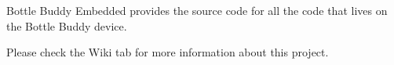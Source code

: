 Bottle Buddy Embedded provides the source code for all the code that lives on the Bottle Buddy device.

Please check the Wiki tab for more information about this project. 